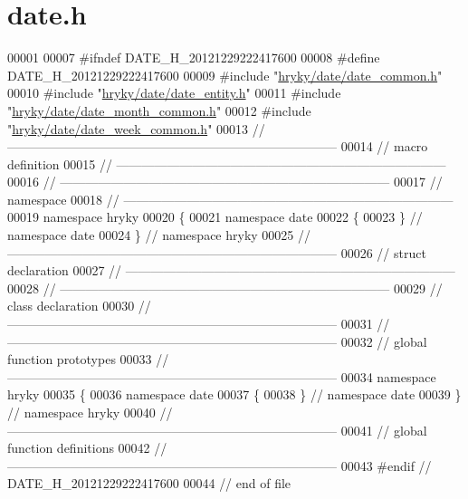 \hypertarget{date_8h_source}{\section{date.\-h}
}

\begin{DoxyCode}
00001 
00007 \textcolor{preprocessor}{#ifndef DATE\_H\_20121229222417600}
00008 \textcolor{preprocessor}{}\textcolor{preprocessor}{#define DATE\_H\_20121229222417600}
00009 \textcolor{preprocessor}{}\textcolor{preprocessor}{#include "\hyperlink{date__common_8h}{hryky/date/date_common.h}"}
00010 \textcolor{preprocessor}{#include "\hyperlink{date__entity_8h}{hryky/date/date_entity.h}"}
00011 \textcolor{preprocessor}{#include "\hyperlink{date__month__common_8h}{hryky/date/date_month_common.h}"}
00012 \textcolor{preprocessor}{#include "\hyperlink{date__week__common_8h}{hryky/date/date_week_common.h}"}
00013 \textcolor{comment}{//
      ------------------------------------------------------------------------------}
00014 \textcolor{comment}{// macro definition}
00015 \textcolor{comment}{//
      ------------------------------------------------------------------------------}
00016 \textcolor{comment}{//
      ------------------------------------------------------------------------------}
00017 \textcolor{comment}{// namespace}
00018 \textcolor{comment}{//
      ------------------------------------------------------------------------------}
00019 \textcolor{keyword}{namespace }hryky
00020 \{
00021 \textcolor{keyword}{namespace }date
00022 \{
00023 \} \textcolor{comment}{// namespace date}
00024 \} \textcolor{comment}{// namespace hryky}
00025 \textcolor{comment}{//
      ------------------------------------------------------------------------------}
00026 \textcolor{comment}{// struct declaration}
00027 \textcolor{comment}{//
      ------------------------------------------------------------------------------}
00028 \textcolor{comment}{//
      ------------------------------------------------------------------------------}
00029 \textcolor{comment}{// class declaration}
00030 \textcolor{comment}{//
      ------------------------------------------------------------------------------}
00031 \textcolor{comment}{//
      ------------------------------------------------------------------------------}
00032 \textcolor{comment}{// global function prototypes}
00033 \textcolor{comment}{//
      ------------------------------------------------------------------------------}
00034 \textcolor{keyword}{namespace }hryky
00035 \{
00036 \textcolor{keyword}{namespace }date
00037 \{
00038 \} \textcolor{comment}{// namespace date}
00039 \} \textcolor{comment}{// namespace hryky}
00040 \textcolor{comment}{//
      ------------------------------------------------------------------------------}
00041 \textcolor{comment}{// global function definitions}
00042 \textcolor{comment}{//
      ------------------------------------------------------------------------------}
00043 \textcolor{preprocessor}{#endif // DATE\_H\_20121229222417600}
00044 \textcolor{preprocessor}{}\textcolor{comment}{// end of file}
\end{DoxyCode}
